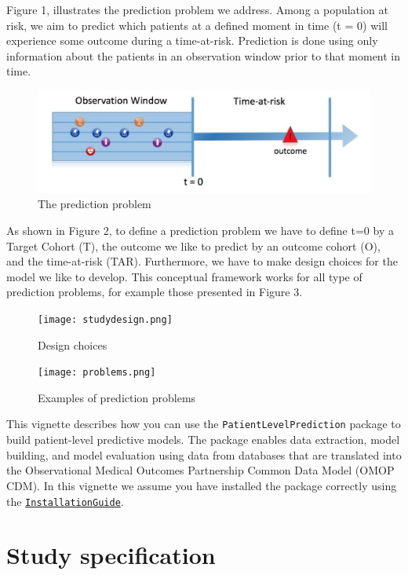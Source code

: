 \documentclass[]{article}
\begin{document}
Figure 1, illustrates the prediction problem we address. Among a
population at risk, we aim to predict which patients at a defined moment
in time (t = 0) will experience some outcome during a time-at-risk.
Prediction is done using only information about the patients in an
observation window prior to that moment in time.

\begin{figure}
\centering
\includegraphics{Figure1.png}
\caption{The prediction problem}
\end{figure}

As shown in Figure 2, to define a prediction problem we have to define
t=0 by a Target Cohort (T), the outcome we like to predict by an outcome
cohort (O), and the time-at-risk (TAR). Furthermore, we have to make
design choices for the model we like to develop. This conceptual
framework works for all type of prediction problems, for example those
presented in Figure 3.

\begin{figure}
\centering
\texttt{[image: studydesign.png]}
\caption{Design choices}
\end{figure}

\begin{figure}
\centering
\texttt{[image: problems.png]}
\caption{Examples of prediction problems}
\end{figure}

This vignette describes how you can use the
\texttt{PatientLevelPrediction} package to build patient-level
predictive models. The package enables data extraction, model building,
and model evaluation using data from databases that are translated into
the Observational Medical Outcomes Partnership Common Data Model (OMOP
CDM). In this vignette we assume you have installed the package
correctly using the
\href{https://github.com/OHDSI/PatientLevelPrediction/blob/master/inst/doc/InstallationGuide.pdf}{\texttt{InstallationGuide}}.

\section{Study specification}\label{study-specification}
\end{document}
